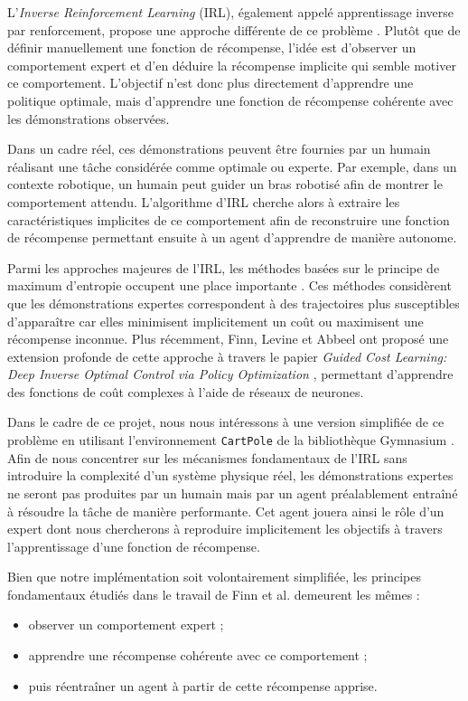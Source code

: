L’\textit{Inverse Reinforcement Learning} (IRL), également appelé apprentissage inverse par renforcement, propose une approche différente de ce problème \cite{ng2000algorithms, abbeel2004apprenticeship}. Plutôt que de définir manuellement une fonction de récompense, l’idée est d’observer un comportement expert et d’en déduire la récompense implicite qui semble motiver ce comportement. L’objectif n’est donc plus directement d’apprendre une politique optimale, mais d’apprendre une fonction de récompense cohérente avec les démonstrations observées.

Dans un cadre réel, ces démonstrations peuvent être fournies par un humain réalisant une tâche considérée comme optimale ou experte. Par exemple, dans un contexte robotique, un humain peut guider un bras robotisé afin de montrer le comportement attendu. L’algorithme d’IRL cherche alors à extraire les caractéristiques implicites de ce comportement afin de reconstruire une fonction de récompense permettant ensuite à un agent d’apprendre de manière autonome.

Parmi les approches majeures de l’IRL, les méthodes basées sur le principe de maximum d’entropie occupent une place importante \cite{ziebart2008maximum, ziebart2010modeling}. Ces méthodes considèrent que les démonstrations expertes correspondent à des trajectoires plus susceptibles d’apparaître car elles minimisent implicitement un coût ou maximisent une récompense inconnue. Plus récemment, Finn, Levine et Abbeel ont proposé une extension profonde de cette approche à travers le papier \textit{Guided Cost Learning: Deep Inverse Optimal Control via Policy Optimization} \cite{finn2016guided}, permettant d’apprendre des fonctions de coût complexes à l’aide de réseaux de neurones.

Dans le cadre de ce projet, nous nous intéressons à une version simplifiée de ce problème en utilisant l’environnement \texttt{CartPole} de la bibliothèque Gymnasium \cite{gymnasium}. Afin de nous concentrer sur les mécanismes fondamentaux de l’IRL sans introduire la complexité d’un système physique réel, les démonstrations expertes ne seront pas produites par un humain mais par un agent préalablement entraîné à résoudre la tâche de manière performante. Cet agent jouera ainsi le rôle d’un expert dont nous chercherons à reproduire implicitement les objectifs à travers l’apprentissage d’une fonction de récompense.

Bien que notre implémentation soit volontairement simplifiée, les principes fondamentaux étudiés dans le travail de Finn et al. \cite{finn2016guided} demeurent les mêmes :
\begin{itemize}
    \item observer un comportement expert ;
    \item apprendre une récompense cohérente avec ce comportement ;
    \item puis réentraîner un agent à partir de cette récompense apprise.
\end{itemize}

